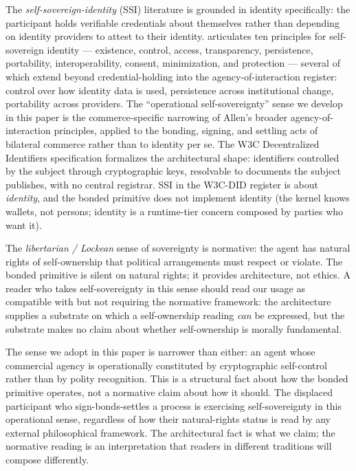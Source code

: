 \documentclass[11pt,a4paper]{article}
\theoremstyle{remark}
\begin{document}
The \emph{self-sovereign-identity} (SSI) literature
\citep{allen2016path, tobin_reed_2017} is grounded in identity
specifically: the participant holds verifiable credentials about
themselves rather than depending on identity providers to attest
to their identity. \citet{allen2016path} articulates ten
principles for self-sovereign identity --- existence, control,
access, transparency, persistence, portability, interoperability,
consent, minimization, and protection --- several of which
extend beyond credential-holding into the agency-of-interaction
register: control over how identity data is used, persistence
across institutional change, portability across providers. The
``operational self-sovereignty'' sense we develop in this paper
is the commerce-specific narrowing of Allen's broader
agency-of-interaction principles, applied to the bonding,
signing, and settling acts of bilateral commerce rather than to
identity per se. The W3C Decentralized Identifiers specification
\citep{w3c_did_2022} formalizes the architectural shape:
identifiers controlled by the subject through cryptographic
keys, resolvable to documents the subject publishes, with no
central registrar. SSI in the W3C-DID register is about
\emph{identity}, and the bonded primitive does not implement
identity (the kernel knows wallets, not persons; identity is a
runtime-tier concern composed by parties who want it).

The \emph{libertarian / Lockean} sense of sovereignty
\citep{nozick1974anarchy, locke1689treatises} is normative: the
agent has natural rights of self-ownership that political
arrangements must respect or violate. The bonded primitive is
silent on natural rights; it provides architecture, not ethics.
A reader who takes self-sovereignty in this sense should read
our usage as compatible with but not requiring the normative
framework: the architecture supplies a substrate on which a
self-ownership reading \emph{can} be expressed, but the
substrate makes no claim about whether self-ownership is
morally fundamental.

The sense we adopt in this paper is narrower than either: an
agent whose commercial agency is operationally constituted by
cryptographic self-control rather than by polity recognition.
This is a structural fact about how the bonded primitive
operates, not a normative claim about how it should. The
displaced participant who sign-bonds-settles a process is
exercising self-sovereignty in this operational sense, regardless
of how their natural-rights status is read by any external
philosophical framework. The architectural fact is what we
claim; the normative reading is an interpretation that readers
in different traditions will compose differently.
\end{document}
